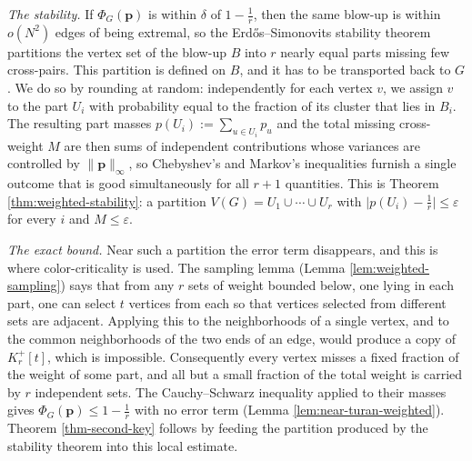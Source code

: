 \documentclass[11pt, a4paper]{article}
\theoremstyle{definition}
\theoremstyle{plain}
\renewcommand{\le}{\leqslant}
\begin{document}
\emph{The stability.} If $\Phi_G(\bm{p})$ is within $\delta$ of $1-\frac1r$,
then the same blow-up is within $o(N^{2})$ edges of being extremal, so the
Erd\H{o}s--Simonovits stability theorem partitions the vertex set of the blow-up $B$ into $r$ nearly equal
parts missing few cross-pairs. 
This partition is defined on $B$, and it has to be
transported back to $G$. We do so by rounding at random: independently for each vertex $v$, we 
assign $v$ to the part $U_i$ with probability equal to 
the fraction of its cluster that lies in $B_i$. 
The resulting part masses $p(U_i):=\sum_{u\in U_i} p_u$ and the total 
missing cross-weight $M$ are then sums of independent contributions whose
variances are controlled by $\lVert \bm{p}\rVert_\infty$, so Chebyshev's and
Markov's inequalities furnish a single outcome that is good simultaneously for
all $r+1$ quantities. This is Theorem \ref{thm:weighted-stability}: a partition
$V(G)=U_1\cup \cdots \cup U_r$ with $\lvert p(U_i)-\frac1r\rvert \le \varepsilon$
for every $i$ and $M\le \varepsilon$.


\emph{The exact bound.} Near such a partition the error term disappears, and 
this is where color-criticality is used. The sampling lemma (Lemma \ref{lem:weighted-sampling}) says that from any $r$
sets of weight bounded below, one lying in each part, one can select $t$ vertices from each so that vertices selected from different sets are adjacent. 
Applying this to 
the neighborhoods of a single vertex, and to the common neighborhoods of the two
ends of an edge, would produce a copy of $K_r^+[t]$, which is impossible.
Consequently every vertex misses a fixed fraction of the weight of some part,
and all but a small fraction of the total weight is carried by $r$ independent
sets. The Cauchy--Schwarz inequality applied to their masses  gives
$\Phi_G(\bm{p})\le 1-\frac1r$ with no error term
(Lemma \ref{lem:near-turan-weighted}). Theorem \ref{thm-second-key} follows by
feeding the partition produced by the stability theorem into this local
estimate.
\end{document}
